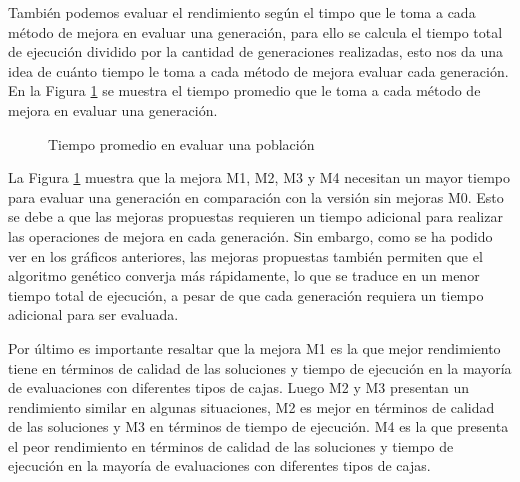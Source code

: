 También podemos evaluar el rendimiento según el timpo que le toma a cada método de mejora en evaluar una generación, para ello se calcula el tiempo total de ejecución dividido por la cantidad de generaciones realizadas, esto nos da una idea de cuánto tiempo le toma a cada método de mejora evaluar cada generación. En la Figura \ref{fig:tiempo_generacion} se muestra el tiempo promedio que le toma a cada método de mejora en evaluar una generación.

\begin{figure}[H]
    \centering
    
    \caption{Tiempo promedio en evaluar una población}
    \label{fig:tiempo_generacion}

\end{figure}

La Figura \ref{fig:tiempo_generacion} muestra que la mejora M1, M2, M3 y M4 necesitan un mayor tiempo para evaluar una generación en comparación con la versión sin mejoras M0. Esto se debe a que las mejoras propuestas requieren un tiempo adicional para realizar las operaciones de mejora en cada generación. Sin embargo, como se ha podido ver en los gráficos anteriores, las mejoras propuestas también permiten que el algoritmo genético converja más rápidamente, lo que se traduce en un menor tiempo total de ejecución, a pesar de que cada generación requiera un tiempo adicional para ser evaluada.

Por último es importante resaltar que la mejora M1 es la que mejor rendimiento tiene en términos de calidad de las soluciones y tiempo de ejecución en la mayoría de evaluaciones con diferentes tipos de cajas. Luego M2 y M3 presentan un rendimiento similar en algunas situaciones, M2 es mejor en términos de calidad de las soluciones y M3 en términos de tiempo de ejecución. M4 es la que presenta el peor rendimiento en términos de calidad de las soluciones y tiempo de ejecución en la mayoría de evaluaciones con diferentes tipos de cajas.
